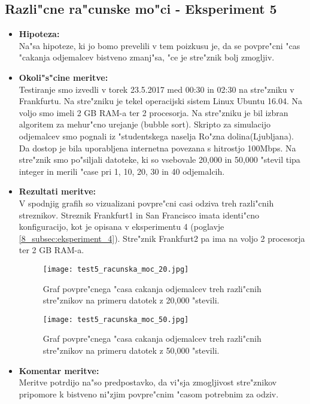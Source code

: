 \subsection{Razli"cne ra"cunske mo"ci - Eksperiment 5}
\begin{itemize}
	\item \textbf{Hipoteza: }  \\
		Na"sa hipoteze, ki jo bomo prevelili v tem poizkusu je, da se povpre"cni "cas "cakanja odjemalcev bistveno zmanj"sa, "ce je stre"znik bolj zmogljiv.
			
	\item \textbf{Okoli"s"cine meritve: } \\
		Testiranje smo izvedli v torek 23.5.2017 med 00:30 in 02:30 na stre"zniku v Frankfurtu. Na stre"zniku je tekel operacijski sistem Linux Ubuntu 16.04. Na voljo smo imeli 2 GB RAM-a ter 2 procesorja. Na stre"zniku je bil izbran algoritem za mehur"cno urejanje (bubble sort). Skripto za simulacijo odjemalcev smo pognali iz "studentskega naselja Ro"zna dolina(Ljubljana). Da dostop je bila uporabljena internetna povezana s hitrostjo 100Mbps. 
		Na stre"znik smo po"siljali datoteke, ki so vsebovale 20,000 in 50,000 "stevil tipa integer in merili "case pri 1, 10, 20, 30 in 40 odjemalcih.

 	\item \textbf{Rezultati meritve: }  \\
		V spodnjig grafih so vizualizani povpre"cni casi odziva treh razli"cnih streznikov. Streznik Frankfurt1 in San Francisco imata identi"cno konfiguracijo, kot je opisana v eksperimentu 4 (poglavje \ref{8_subsec:eksperiment_4}). Stre"znik Frankfurt2 pa ima na voljo 2 procesorja ter 2 GB RAM-a. 
		\begin{figure}[h]
  		\centering
  		  \texttt{[image: test5\_racunska\_moc\_20.jpg]}
  		\caption{Graf povpre"cnega "casa cakanja odjemalcev treh razli"cnih stre"znikov na primeru datotek z 20,000 "stevili.}
  		\label{8_graf_racunska_moc_20}
		\end{figure}

	\begin{figure}[h]
  		\centering
  		  \texttt{[image: test5\_racunska\_moc\_50.jpg]}
  		\caption{Graf povpre"cnega "casa cakanja odjemalcev treh razli"cnih stre"znikov na primeru datotek z 50,000 "stevili.}
  		\label{8_graf_racunska_moc_50}
		\end{figure}
	\pagebreak
	\item \textbf{Komentar meritve: } \\ 
		Meritve potrdijo na"so predpostavko, da vi"sja zmogljivost stre"znikov pripomore k bistveno ni"zjim povpre"cnim "casom potrebnim za odziv.



\end{itemize}


